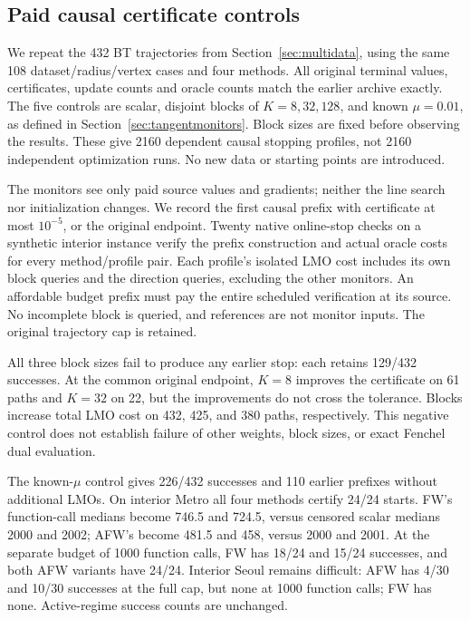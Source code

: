 \subsection{Paid causal certificate controls}
\label{sec:certificateexperiment}
We repeat the 432 BT trajectories from Section~\ref{sec:multidata},
using the same 108 dataset/radius/vertex cases and four methods. All
original terminal values, certificates, update counts and oracle counts
match the earlier archive exactly. The five controls are scalar,
disjoint blocks of $K=8,32,128$, and known $\mu=0.01$, as defined in
Section~\ref{sec:tangentmonitors}. Block sizes are fixed before observing
the results. These give 2160 dependent causal stopping profiles, not
2160 independent optimization runs. No new data or starting points
are introduced.

The monitors see only paid source values and gradients; neither the
line search nor initialization changes. We record the first causal
prefix with certificate at most $10^{-5}$, or the original endpoint.
Twenty native online-stop checks on a synthetic interior instance verify
the prefix construction and actual oracle costs for every method/profile
pair. Each profile's isolated LMO cost includes its own block
queries and the direction queries, excluding the other monitors.
An affordable budget prefix must pay the entire scheduled verification
at its source. No incomplete block is queried, and references are not
monitor inputs. The original trajectory cap is retained.

All three block sizes fail to produce any earlier stop: each retains
129/432 successes. At the common original endpoint, $K=8$ improves
the certificate on 61 paths and $K=32$ on 22, but the improvements do
not cross the tolerance. Blocks increase total LMO cost on 432, 425,
and 380 paths, respectively. This negative control does not establish
failure of other weights, block sizes, or exact Fenchel dual evaluation.

The known-$\mu$ control gives 226/432 successes and 110 earlier
prefixes without additional LMOs. On interior Metro all four methods
certify 24/24 starts. FW's function-call medians become 746.5 and
724.5, versus censored scalar medians 2000 and 2002; AFW's become
481.5 and 458, versus 2000 and 2001. At the separate budget of
1000 function calls, FW has 18/24 and 15/24 successes, and both AFW
variants have 24/24. Interior Seoul remains difficult: AFW has 4/30
and 10/30 successes at the full cap, but none at 1000 function calls;
FW has none. Active-regime success counts are unchanged.

